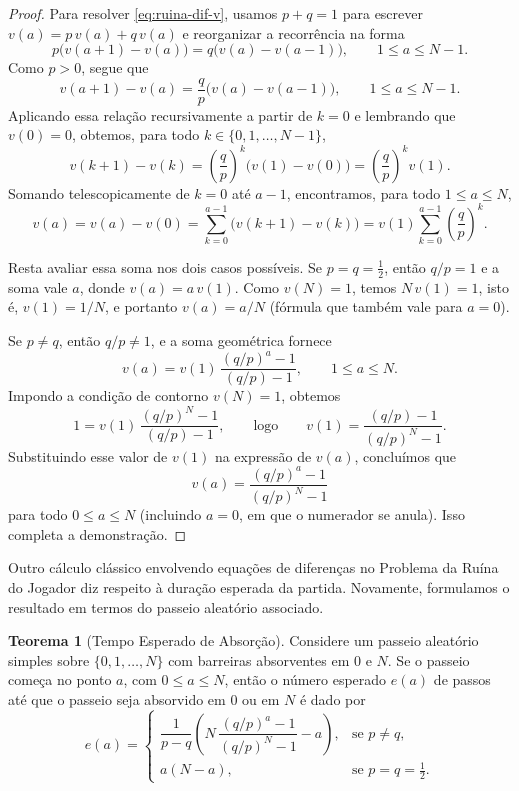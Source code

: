 \documentclass[12pt,portuguese]{article}
\theoremstyle{definition}
\newtheorem{theorem}{Teorema}
\theoremstyle{plainexercise}
\theoremstyle{starredexercise}
\theoremstyle{definition}
\begin{document}
\begin{proof}
  Para resolver \eqref{eq:ruina-dif-v}, usamos $p + q = 1$ para escrever
  $v(a) = p\,v(a) + q\,v(a)$ e reorganizar a recorrência na forma
  \[
    p\bigl(v(a + 1) - v(a)\bigr) = q\bigl(v(a) - v(a - 1)\bigr),
    \qquad 1 \leqslant a \leqslant N - 1.
  \]
  Como $p > 0$, segue que
  \[
    v(a + 1) - v(a) = \frac{q}{p}\bigl(v(a) - v(a - 1)\bigr),
    \qquad 1 \leqslant a \leqslant N - 1.
  \]
  Aplicando essa relação recursivamente a partir de $k = 0$ e lembrando que
  $v(0) = 0$, obtemos, para todo $k \in \{0, 1, \ldots, N - 1\}$,
  \[
    v(k + 1) - v(k) = \left(\frac{q}{p}\right)^k \bigl(v(1) - v(0)\bigr)
    = \left(\frac{q}{p}\right)^k v(1).
  \]
  Somando telescopicamente de $k = 0$ até $a - 1$, encontramos, para todo
  $1 \leqslant a \leqslant N$,
  \[
    v(a) = v(a) - v(0)
    = \sum_{k=0}^{a-1} \bigl(v(k + 1) - v(k)\bigr)
    = v(1) \sum_{k=0}^{a-1} \left(\frac{q}{p}\right)^k.
  \]

  Resta avaliar essa soma nos dois casos possíveis. Se $p = q = \tfrac{1}{2}$,
  então $q/p = 1$ e a soma vale $a$, donde $v(a) = a\,v(1)$. Como $v(N) = 1$,
  temos $N\,v(1) = 1$, isto é, $v(1) = 1/N$, e portanto $v(a) = a/N$ (fórmula
  que também vale para $a = 0$).

  Se $p \neq q$, então $q/p \neq 1$, e a soma geométrica fornece
  \[
    v(a) = v(1)\,\frac{(q/p)^a - 1}{(q/p) - 1},
    \qquad 1 \leqslant a \leqslant N.
  \]
  Impondo a condição de contorno $v(N) = 1$, obtemos
  \[
    1 = v(1)\,\frac{(q/p)^N - 1}{(q/p) - 1},
    \qquad \text{logo} \qquad
    v(1) = \frac{(q/p) - 1}{(q/p)^N - 1}.
  \]
  Substituindo esse valor de $v(1)$ na expressão de $v(a)$, concluímos que
  \[
    v(a) = \frac{(q/p)^a - 1}{(q/p)^N - 1}
  \]
  para todo $0 \leqslant a \leqslant N$ (incluindo $a = 0$, em que o numerador
  se anula). Isso completa a demonstração.
\end{proof}

Outro cálculo clássico envolvendo equações de diferenças no Problema da Ruína
do Jogador diz respeito à duração esperada da partida. Novamente, formulamos o
resultado em termos do passeio aleatório associado.

\begin{theorem}[Tempo Esperado de Absorção]\label{thm:ruina-duracao}
  Considere um passeio aleatório simples sobre $\{0, 1, \ldots, N\}$ com
  barreiras absorventes em $0$ e $N$. Se o passeio começa no ponto $a$, com
  $0 \leqslant a \leqslant N$, então o número esperado $e(a)$ de passos até que
  o passeio seja absorvido em $0$ ou em $N$ é dado por
  \begin{equation}\label{eq:ruina-e}
    e(a) =
    \begin{cases}
      \dfrac{1}{p - q}
      \left( N\,\dfrac{(q/p)^a - 1}{(q/p)^N - 1} - a \right),
      & \text{se } p \neq q, \\[0.4cm]
      a(N - a), & \text{se } p = q = \tfrac{1}{2}.
    \end{cases}
  \end{equation}
\end{theorem}
\end{document}
